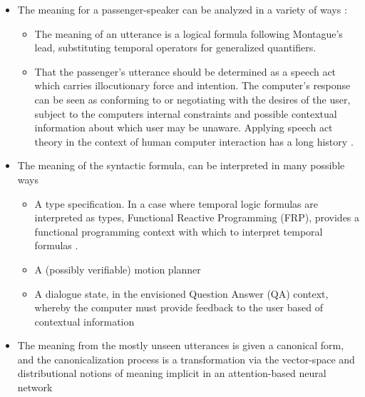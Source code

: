 \documentclass{article}
\begin{document}
\begin{itemize}
\item The meaning for a passenger-speaker can be analyzed in a variety of ways :
 \begin{itemize}
   \item The meaning of an utterance is a logical formula following Montague's
   lead, substituting temporal operators for generalized quantifiers.
   \item That the passenger's utterance should be determined as a speech act
     which carries illocutionary force and intention. The computer's
     response can be seen as conforming to or negotiating with the desires of
     the user, subject to the computers internal constraints and possible
     contextual information about which user may be unaware. Applying speech
     act theory in the context of human computer interaction has a long history
     \cite{winograd}.
 \end{itemize}
\item The meaning of the syntactic formula, can be interpreted in many possible ways
 \begin{itemize}
   \item A type specification. In a case where
     temporal logic formulas are interpreted as types, Functional Reactive
     Programming (FRP), provides a functional programming context with which to
     interpret temporal formulas
     \cite{hudak}.
   \item A (possibly verifiable) motion planner  \cite{verifiedMotion} \cite{7759412} \cite{kuo2020deep}
   \item A dialogue state, in the envisioned Question Answer (QA) context, whereby
     the computer must provide feedback to the user based of contextual information
 \end{itemize}
\item The meaning from the mostly unseen utterances is given a canonical form,
 and the canonicalization process is a transformation via the vector-space and
 distributional notions of meaning implicit in an attention-based neural network
\end{itemize}
\end{document}
